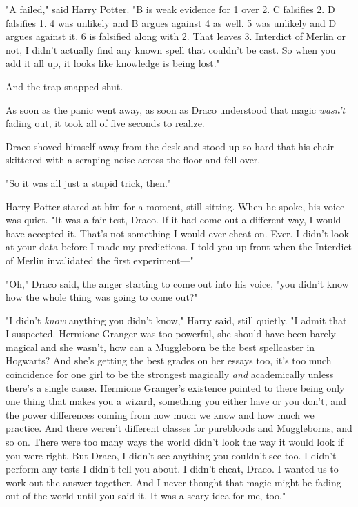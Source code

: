 "A failed," said Harry Potter. "B is weak evidence for 1 over 2. C falsifies 2.
D falsifies 1. 4 was unlikely and B argues against 4 as well. 5 was unlikely
and D argues against it. 6 is falsified along with 2. That leaves 3. Interdict
of Merlin or not, I didn't actually find any known spell that couldn't be cast.
So when you add it all up, it looks like knowledge is being lost."

And the trap snapped shut.

As soon as the panic went away, as soon as Draco understood that magic
\emph{wasn't} fading out, it took all of five seconds to realize.

Draco shoved himself away from the desk and stood up so hard that his chair
skittered with a scraping noise across the floor and fell over.

"So it was all just a stupid trick, then."

Harry Potter stared at him for a moment, still sitting. When he spoke, his
voice was quiet. "It was a fair test, Draco. If it had come out a different
way, I would have accepted it. That's not something I would ever cheat on.
Ever. I didn't look at your data before I made my predictions. I told you up
front when the Interdict of Merlin invalidated the first experiment\mbox{---}"

"Oh," Draco said, the anger starting to come out into his voice, "you didn't
know how the whole thing was going to come out?"

"I didn't \emph{know} anything you didn't know," Harry said, still quietly. "I
admit that I suspected. Hermione Granger was too powerful, she should have been
barely magical and she wasn't, how can a Muggleborn be the best spellcaster in
Hogwarts? And she's getting the best grades on her essays too, it's too much
coincidence for one girl to be the strongest magically \emph{and} academically
unless there's a single cause. Hermione Granger's existence pointed to there
being only one thing that makes you a wizard, something you either have or you
don't, and the power differences coming from how much we know and how much we
practice. And there weren't different classes for purebloods and Muggleborns,
and so on. There were too many ways the world didn't look the way it would look
if you were right. But Draco, I didn't see anything you couldn't see too. I
didn't perform any tests I didn't tell you about. I didn't cheat, Draco. I
wanted us to work out the answer together. And I never thought that magic might
be fading out of the world until you said it. It was a scary idea for me, too."

